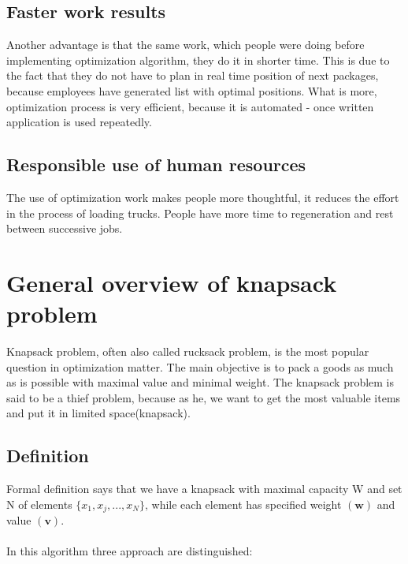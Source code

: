\documentclass[conference,compsoc]{IEEEtran}
\begin{document}
\subsection{Faster work results}
Another advantage is that the same work, which people were doing before implementing optimization algorithm, they do it in shorter time. This is due to the fact that they do not have to plan in real time position of next packages, because employees have generated list with optimal positions. What is more, optimization process is very efficient, because it is automated - once written application is used repeatedly.

\subsection{Responsible use of human resources}
The use of optimization work makes people more thoughtful, it reduces the effort in the process of loading trucks. People have more time to regeneration and rest between successive jobs.

\section{General overview of knapsack problem}
Knapsack problem, often also called rucksack problem, is the most popular question in optimization matter. The main objective is to pack a goods as much as is possible with maximal value and minimal weight. The knapsack problem is said to be a thief problem, because as he, we want to get the most valuable items and put it in limited space(knapsack).

\subsection{Definition}
Formal definition says that we have a knapsack with maximal capacity W and set N of elements 
$ \{x_1,x_j,...,x_N\} \textrm{,}$
while each element has specified weight $(\textbf{w})$ and value $(\textbf{v})$.\\\\
 
In this algorithm three approach are distinguished:
\end{document}
